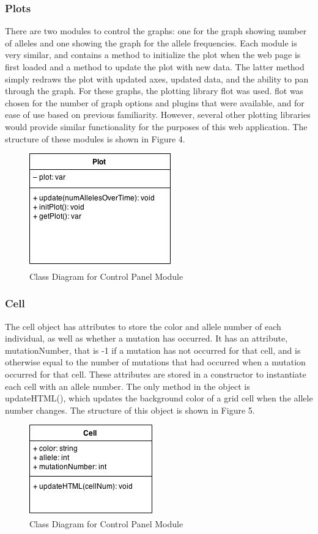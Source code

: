 \documentclass[12pt]{article}
\begin{document}
\begin{spacing}{1.5}
\subsubsection{Plots}
There are two modules to control the graphs: one for the graph showing number of alleles and one showing the graph for the allele frequencies. Each module is very similar, and contains a method to initialize the plot when the web page is first loaded and a method to update the plot with new data. The latter method simply redraws the plot with updated axes, updated data, and the ability to pan through the graph. For these graphs, the plotting library flot \cite{flot} was used. flot was chosen for the number of graph options and plugins that were available, and for ease of use based on previous familiarity. However, several other plotting libraries would provide similar functionality for the purposes of this web application. The structure of these modules is shown in Figure 4.
\begin{figure}[h]
\caption{Class Diagram for Control Panel Module}
\centering
\includegraphics[scale=0.5]{plot-class-diagram}
\end{figure}

\subsubsection{Cell}
The cell object has attributes to store the color and allele number of each individual, as well as whether a mutation has occurred. It has an attribute, mutationNumber, that is -1 if a mutation has not occurred for that cell, and is otherwise equal to the number of mutations that had occurred when a mutation occurred for that cell. These attributes are stored in a constructor to instantiate each cell with an allele number. The only method in the object is updateHTML(), which updates the background color of a grid cell when the allele number changes. The structure of this object is shown in Figure 5.
\begin{figure}[h]
\caption{Class Diagram for Control Panel Module}
\centering
\includegraphics[scale=0.5]{cell-class-diagram}
\end{figure}


\end{spacing}
\end{document}
